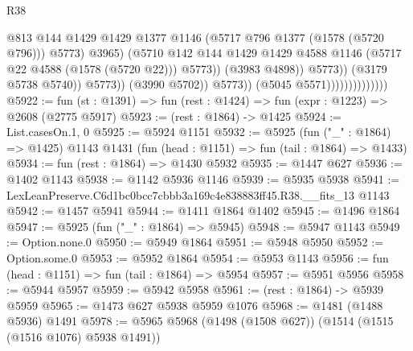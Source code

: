 \begin{lexlean}{R38}
\begin{coremodule}
                                                      @813
                                                      @144
                                                      @1429
                                                      @1429
                                                      @1377
                                                      @1146
                                                      (@5717 @796 @1377 (@1578 (@5720 @796)))
                                                      @5773)
                                                    @3965)
                                                  (@5710
                                                    @142
                                                    @144
                                                    @1429
                                                    @1429
                                                    @4588
                                                    @1146
                                                    (@5717 @22 @4588 (@1578 (@5720 @22)))
                                                    @5773))
                                                (@3983 @4898))
                                              @5773))
                                          (@3179 @5738 @5740))
                                        @5773))
                                    (@3990 @5702))
                                  @5773))
                              (@5045 @5571))))))))))))))
@5922 := fun (st : @1391) => fun (rest : @1424) => fun (expr : @1223) => @2608 (@2775 @5917)
@5923 := (rest : @1864) -> @1425
@5924 := List.casesOn.{1, 0}
@5925 := @5924 @1151
@5932 := @5925
    (fun ("_" : @1864) => @1425)
    @1143
    @1431
    (fun (head : @1151) => fun (tail : @1864) => @1433)
@5934 := fun (rest : @1864) => @1430 @5932
@5935 := @1447 @627
@5936 := @1402 @1143
@5938 := @1142 @5936 @1146
@5939 := @5935 @5938
@5941 := LexLeanPreserve.C6d1bc0bcc7cbbb3a169c4e838883ff45.R38.__fits_13 @1143
@5942 := @1457 @5941
@5944 := @1411 @1864 @1402
@5945 := @1496 @1864
@5947 := @5925 (fun ("_" : @1864) => @5945)
@5948 := @5947 @1143
@5949 := Option.none.{0}
@5950 := @5949 @1864
@5951 := @5948 @5950
@5952 := Option.some.{0}
@5953 := @5952 @1864
@5954 := @5953 @1143
@5956 := fun (head : @1151) => fun (tail : @1864) => @5954
@5957 := @5951 @5956
@5958 := @5944 @5957
@5959 := @5942 @5958
@5961 := (rest : @1864) -> @5939 @5959
@5965 := @1473 @627 @5938 @5959 @1076
@5968 := @1481 (@1488 @5936) @1491
@5978 := @5965 @5968 (@1498 (@1508 @627)) (@1514 (@1515 (@1516 @1076) @5938 @1491))

\end{coremodule}
\end{lexlean}
